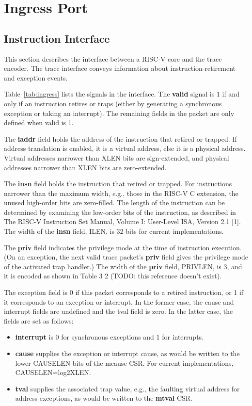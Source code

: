 \chapter{Ingress Port} \label{Interface}

\section{Instruction Interface}
This section describes the interface between a RISC-V core and the
trace encoder. The trace interface conveys information about
instruction-retirement and exception events.

Table~\ref{tab:ingress} lists the signals in the interface. The {\bf
  valid} signal is 1 if and only if an instruction retires or traps
(either by generating a synchronous exception or taking an interrupt).
The remaining fields in the packet are only defined when valid is 1.

The {\bf iaddr} field holds the address of the instruction that retired or
trapped. If address translation is enabled, it is a virtual address,
else it is a physical address. Virtual addresses narrower than XLEN
bits are sign-extended, and physical addresses narrower than XLEN bits
are zero-extended.

The {\bf insn} field holds the instruction that retired or
trapped. For instructions narrower than the maximum width, e.g., those
in the RISC-V C extension, the unused high-order bits are
zero-filled. The length of the instruction can be determined by
examining the low-order bits of the instruction, as described in The
RISC-V Instruction Set Manual, Volume I: User-Level ISA, Version 2.1
[1]. The width of the {\bf insn} field, ILEN, is 32 bits for current
implementations.

The {\bf priv} field indicates the privilege mode at the time of instruction
execution. (On an exception, the next valid trace packet's {\bf priv} field
gives the privilege mode of the activated trap handler.) The width of
the {\bf priv} field, PRIVLEN, is 3, and it is encoded as shown in Table 3
2 (TODO: this reference doesn't exist).

The exception field is 0 if this packet corresponds to a retired
instruction, or 1 if it corresponds to an exception or interrupt.  In
the former case, the cause and interrupt fields are undefined and the
tval field is zero.  In the latter case, the fields are set as
follows:

\begin{itemize}
  \item {\bf interrupt} is 0 for synchronous exceptions and 1 for
    interrupts.
  \item {\bf cause} supplies the exception or interrupt cause, as
    would be written to the lower CAUSELEN bits of the mcause CSR. For
    current implementations, CAUSELEN=log2XLEN.
  \item {\bf tval} supplies the associated trap value, e.g., the
    faulting virtual address for address exceptions, as would be
    written to the {\bf mtval} CSR.
\end{itemize}

